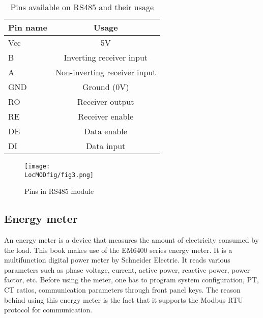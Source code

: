 \begin{table}
  \centering
  \caption{Pins available on RS485 and their usage}
  \label{tab:rs-485-pins}
  \begin{tabular}{lc}\hline
    Pin name & Usage                        \\ \hline
    Vcc      & 5V                           \\
    B        & Inverting receiver input     \\
    A        & Non-inverting receiver input \\
    GND      & Ground (0V)                  \\
    RO       & Receiver output              \\
    RE       & Receiver enable              \\
    DE       & Data enable                  \\
    DI       & Data input                   \\
    \hline
  \end{tabular}
\end{table}





\begin{figure}
  \centering
  \texttt{[image: \\LocMODfig/fig3.png]}
  \caption{Pins in RS485 module}
  \label{rs-485}
\end{figure}

\subsection{Energy meter}
\label{sec:energy-meter}
An energy meter is a device that measures the amount of electricity consumed
by the load. This book makes use of the EM6400 series energy meter. It is a
multifunction digital power meter by Schneider Electric. It
reads various parameters such as phase voltage, current, active power,
reactive power, power factor, etc. Before using the meter, one has to
program system configuration, PT, CT ratios, communication parameters
through front panel keys. The reason behind using this energy meter is
the fact that it supports the Modbus RTU protocol for communication.

